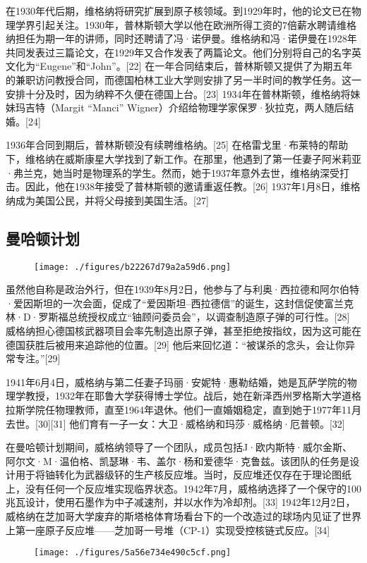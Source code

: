 在1930年代后期，维格纳将研究扩展到原子核领域。到1929年时，他的论文已在物理学界引起关注。1930年，普林斯顿大学以他在欧洲所得工资的7倍薪水聘请维格纳担任为期一年的讲师，同时还聘请了冯·诺伊曼。维格纳和冯·诺伊曼在1928年共同发表过三篇论文，在1929年又合作发表了两篇论文。他们分别将自己的名字英文化为“Eugene”和“John”。[22] 在一年合同结束后，普林斯顿又提供了为期五年的兼职访问教授合同，而德国柏林工业大学则安排了另一半时间的教学任务。这一安排十分及时，因为纳粹不久便在德国上台。[23] 1934年在普林斯顿，维格纳将妹妹玛吉特（Margit “Manci” Wigner）介绍给物理学家保罗·狄拉克，两人随后结婚。[24]

1936年合同到期后，普林斯顿没有续聘维格纳。[25] 在格雷戈里·布莱特的帮助下，维格纳在威斯康星大学找到了新工作。在那里，他遇到了第一任妻子阿米莉亚·弗兰克，她当时是物理系的学生。然而，她于1937年意外去世，维格纳深受打击。因此，他在1938年接受了普林斯顿的邀请重返任教。[26] 1937年1月8日，维格纳成为美国公民，并将父母接到美国生活。[27]
\subsection{曼哈顿计划}
\begin{figure}[ht]
\centering
\texttt{[image: ./figures/b22267d79a2a59d6.png]}
\caption{} \label{fig_YJwgn_4}
\end{figure}
虽然他自称是政治外行，但在1939年8月2日，他参与了与利奥·西拉德和阿尔伯特·爱因斯坦的一次会面，促成了“爱因斯坦–西拉德信”的诞生，这封信促使富兰克林·D·罗斯福总统授权成立“铀顾问委员会”，以调查制造原子弹的可行性。[28] 威格纳担心德国核武器项目会率先制造出原子弹，甚至拒绝按指纹，因为这可能在德国获胜后被用来追踪他的位置。[29] 他后来回忆道：“被谋杀的念头，会让你异常专注。”[29]

1941年6月4日，威格纳与第二任妻子玛丽·安妮特·惠勒结婚，她是瓦萨学院的物理学教授，1932年在耶鲁大学获得博士学位。战后，她在新泽西州罗格斯大学道格拉斯学院任物理教师，直至1964年退休。他们一直婚姻稳定，直到她于1977年11月去世。[30][31] 他们育有一子一女：大卫·威格纳和玛莎·威格纳·厄普顿。[32]

在曼哈顿计划期间，威格纳领导了一个团队，成员包括J·欧内斯特·威尔金斯、阿尔文·M·温伯格、凯瑟琳·韦、盖尔·杨和爱德华·克鲁兹。该团队的任务是设计用于将铀转化为武器级钚的生产核反应堆。当时，反应堆还仅存在于理论图纸上，没有任何一个反应堆实现临界状态。1942年7月，威格纳选择了一个保守的100兆瓦设计，使用石墨作为中子减速剂，并以水作为冷却剂。[33] 1942年12月2日，威格纳在芝加哥大学废弃的斯塔格体育场看台下的一个改造过的球场内见证了世界上第一座原子反应堆——芝加哥一号堆（CP-1）实现受控核链式反应。[34]
\begin{figure}[ht]
\centering
\texttt{[image: ./figures/5a56e734e490c5cf.png]}
\caption{} \label{fig_YJwgn_5}
\end{figure}
